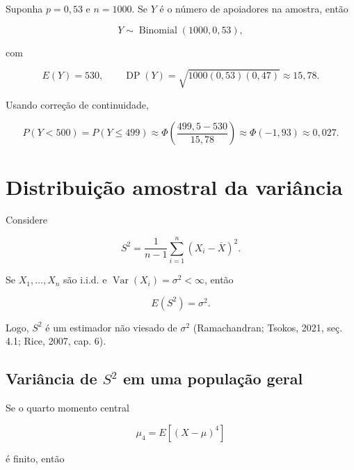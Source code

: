\documentclass[
  letterpaper,
  DIV=11,
  numbers=noendperiod]{scrreprt}
\begin{document}
\begin{tcolorbox}[enhanced jigsaw, colback=white, leftrule=.75mm, colbacktitle=quarto-callout-tip-color!10!white, breakable, titlerule=0mm, bottomtitle=1mm, title=\textcolor{quarto-callout-tip-color}{\faLightbulb}\hspace{0.5em}{Exemplo --- Apoio a uma política pública}, colframe=quarto-callout-tip-color-frame, toprule=.15mm, opacityback=0, bottomrule=.15mm, opacitybacktitle=0.6, arc=.35mm, toptitle=1mm, rightrule=.15mm, coltitle=black, left=2mm]

Suponha \(p=0{,}53\) e \(n=1000\). Se \(Y\) é o número de apoiadores na
amostra, então

\[Y\sim\operatorname{Binomial}(1000,0{,}53),\]

com

\[E(Y)=530,
\qquad
\operatorname{DP}(Y)=\sqrt{1000(0{,}53)(0{,}47)}\approx15{,}78.\]

Usando correção de continuidade,

\[P(Y<500)=P(Y\leq499)
\approx
\Phi\left(\frac{499{,}5-530}{15{,}78}\right)
\approx
\Phi(-1{,}93)
\approx
0{,}027.\]

\end{tcolorbox}

\section{Distribuição amostral da
variância}\label{distribuiuxe7uxe3o-amostral-da-variuxe2ncia}

Considere

\[S^2=\frac{1}{n-1}\sum_{i=1}^n(X_i-\overline{X})^2.\]

Se \(X_1,\ldots,X_n\) são i.i.d. e
\(\operatorname{Var}(X_i)=\sigma^2<\infty\), então

\[E(S^2)=\sigma^2.\]

Logo, \(S^2\) é um estimador não viesado de \(\sigma^2\) (Ramachandran;
Tsokos, 2021, seç. 4.1; Rice, 2007, cap. 6).

\subsection{\texorpdfstring{Variância de \(S^2\) em uma população
geral}{Variância de S\^{}2 em uma população geral}}\label{variuxe2ncia-de-s2-em-uma-populauxe7uxe3o-geral}

Se o quarto momento central

\[\mu_4=E[(X-\mu)^4]\]

é finito, então
\end{document}
